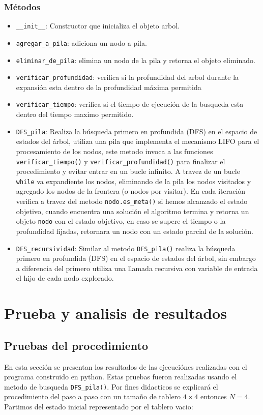 \documentclass[conference]{IEEEtran}
\begin{document}
    \subsubsection{Métodos}\label{AA_1}
        \begin{itemize}
        \item \texttt{\_\_init\_\_}: Constructor que inicializa el objeto arbol.
        \item \texttt{agregar\_a\_pila}: adiciona un nodo a pila.
        \item \texttt{eliminar\_de\_pila}: elimina un nodo de la pila y retorna el objeto eliminado.
        \item \texttt{verificar\_profundidad}: verifica si la profundidad del arbol durante la expansión esta dentro de la profundidad máxima permitida
        \item \texttt{verificar\_tiempo}: verifica si el tiempo de ejecución de la busqueda esta dentro del tiempo maximo permitido.
        \item \texttt{DFS\_pila}: Realiza la búsqueda primero en profundida (DFS) en el espacio de estados del árbol, utiliza una pila que implementa el mecanismo LIFO para el procesamiento de los nodos, este metodo invoca a las funciones \texttt{verificar\_tiempo()} y \texttt{verificar\_profundidad()} para finalizar el procedimiento y evitar entrar en un bucle infinito. A travez de un bucle \texttt{while} va expandiente los nodos, eliminando de la pila los nodos visitados y agregado los nodos de la frontera (o nodos por visitar). En cada iteración verifica a travez del metodo \texttt{nodo.es\_meta()} si hemos alcanzado el estado objetivo, cuando encuentra una solución el algoritmo termina y retorna un objeto \texttt{nodo} con el estado objetivo, en caso se supere el tiempo o la profundidad fijadas, retornara un nodo con un estado parcial de la solución.
        \item \texttt{DFS\_recursividad}: Similar al metodo \texttt{DFS\_pila()} realiza la búsqueda primero en profundida (DFS) en el espacio de estados del árbol, sin embargo a diferencia del primero utiliza una llamada recursiva con variable de entrada el hijo de cada nodo explorado.
        \end{itemize}

\section{Prueba y analisis de resultados}\label{pruebas}
\subsection{Pruebas del procedimiento}
En esta sección se presentan los resultados de las ejecuciónes realizadas con el programa construido en python. Estas pruebas fueron realizadas usando el metodo de busqueda \texttt{DFS\_pila()}. 
Por fines didacticos se explicará el procedimiento del paso a paso con un tamaño de tablero $4\times4$ entonces $N=4$.
Partimos del estado inicial representado por el tablero vacio:
\end{document}
